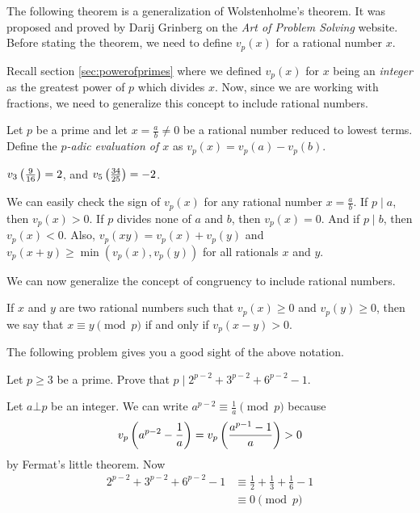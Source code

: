 	The following theorem is a generalization of Wolstenholme's theorem. It was proposed and proved by Darij Grinberg on the \textit{Art of Problem Solving} website. Before stating the theorem, we need to define $v_p(x)$ for a rational number $x$.

	Recall section \eqref{sec:powerofprimes} where we defined $v_p(x)$ for $x$ being an \textit{integer} as the greatest power of $p$ which divides $x$. Now, since we are working with fractions, we need to generalize this concept to include rational numbers.

	\begin{definition}
		Let $p$ be a prime and let $x = \frac{a}{b} \neq 0$ be a rational number reduced to lowest terms. Define the \textit{$p$-adic evaluation of $x$} as $v_p(x) = v_p(a)-v_p(b)$.
	\end{definition}

	\begin{example}
		$v_{3}\left(\frac{9}{16}\right)= 2$, and $v_{5}\left(\frac{34}{25}\right) = -2$.
	\end{example}

	\begin{note}
		We can easily check the sign of $v_p(x)$ for any rational number $x=\frac{a}{b}$. If $p\mid a$, then $v_p(x)>0$. If $p$ divides none of $a$ and $b$, then $v_p(x)=0$. And if $p\mid b$, then $v_p(x)<0$. Also,  $ v_{p}\left(xy\right) = v_{p}\left(x\right) + v_{p}\left(y\right)$ and $ v_{p}\left(x + y\right)\geq\min\left(v_{p}\left(x\right),v_{p}\left(y\right)\right)$ for all rationals $x$ and $y$.
	\end{note}

	We can now generalize the concept of congruency to include rational numbers.
	\begin{definition}
		If $x$ and $y$ are two rational numbers such that $ v_{p}\left(x\right)\geq 0$ and $ v_{p}\left(y\right)\geq 0$, then we say that $ x\equiv y\pmod p$ if and only if $ v_{p}\left(x - y\right) > 0$.
	\end{definition}

	The following problem gives you a good sight of the above notation.

	\begin{problem}
		Let $p \geq 3$ be a prime. Prove that $p\mid 2^{p-2}+3^{p-2}+6^{p-2}-1$.
	\end{problem}

	\begin{solution}
		Let $a \bot p$ be an integer. We can write $a^{p-2} \equiv \frac{1}{a} \pmod p$ because
			\begin{align*}
				v_{p}\left(a^{p-2}- \frac{1}{a}\right)=v_{p}\left(\frac{a^{p-1}-1}{a}\right)>0
			\end{align*}
		by Fermat's little theorem. Now
		\begin{align*}
		2^{p-2}+3^{p-2}+6^{p-2}-1
			& \equiv \frac{1}{2}+\frac{1}{3}+\frac{1}{6}-1\\
			& \equiv 0 \pmod p
		\end{align*}
	\end{solution}

